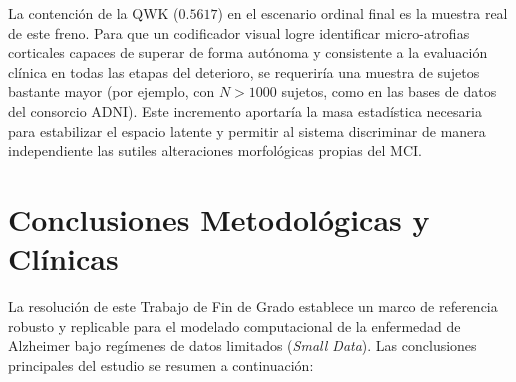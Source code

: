 \documentclass[12pt, oneside, english, spanish]{book}
\begin{document}
La contención de la QWK ($0.5617$) en el escenario ordinal final es la muestra real de este freno. Para que un codificador visual logre identificar micro-atrofias corticales capaces de superar de forma autónoma y consistente a la evaluación clínica en todas las etapas del deterioro, se requeriría una muestra de sujetos bastante mayor (por ejemplo, con $N > 1000$ sujetos, como en las bases de datos del consorcio ADNI). Este incremento aportaría la masa estadística necesaria para estabilizar el espacio latente y permitir al sistema discriminar de manera independiente las sutiles alteraciones morfológicas propias del MCI.

\section{Conclusiones Metodológicas y Clínicas} \label{sec:conclusiones_finales}

La resolución de este Trabajo de Fin de Grado establece un marco de referencia robusto y replicable para el modelado computacional de la enfermedad de Alzheimer bajo regímenes de datos limitados (\textit{Small Data}). Las conclusiones principales del estudio se resumen a continuación:
\end{document}
